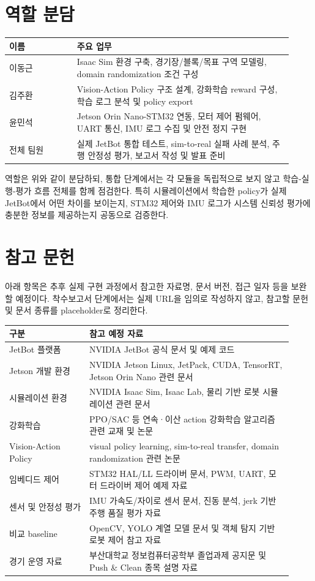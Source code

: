 \documentclass[titlepage]{pnureport}
\begin{document}
\chapter{역할 분담}

\begin{longtable}{p{0.22\linewidth}p{0.70\linewidth}}
\toprule
이름 & 주요 업무 \\
\midrule
\endhead
이동근 & Isaac Sim 환경 구축, 경기장/블록/목표 구역 모델링, domain randomization 조건 구성 \\
김주환 & Vision-Action Policy 구조 설계, 강화학습 reward 구성, 학습 로그 분석 및 policy export \\
윤민석 & Jetson Orin Nano-STM32 연동, 모터 제어 펌웨어, UART 통신, IMU 로그 수집 및 안전 정지 구현 \\
전체 팀원 & 실제 JetBot 통합 테스트, sim-to-real 실패 사례 분석, 주행 안정성 평가, 보고서 작성 및 발표 준비 \\
\bottomrule
\end{longtable}

역할은 위와 같이 분담하되, 통합 단계에서는 각 모듈을 독립적으로 보지 않고 학습-실행-평가 흐름 전체를 함께 점검한다. 특히 시뮬레이션에서 학습한 policy가 실제 JetBot에서 어떤 차이를 보이는지, STM32 제어와 IMU 로그가 시스템 신뢰성 평가에 충분한 정보를 제공하는지 공동으로 검증한다.

\chapter{참고 문헌}

아래 항목은 추후 실제 구현 과정에서 참고한 자료명, 문서 버전, 접근 일자 등을 보완할 예정이다. 착수보고서 단계에서는 실제 URL을 임의로 작성하지 않고, 참고할 문헌 및 문서 종류를 placeholder로 정리한다.

\begin{longtable}{p{0.26\linewidth}p{0.66\linewidth}}
\toprule
구분 & 참고 예정 자료 \\
\midrule
\endhead
JetBot 플랫폼 & NVIDIA JetBot 공식 문서 및 예제 코드 \\
Jetson 개발 환경 & NVIDIA Jetson Linux, JetPack, CUDA, TensorRT, Jetson Orin Nano 관련 문서 \\
시뮬레이션 환경 & NVIDIA Isaac Sim, Isaac Lab, 물리 기반 로봇 시뮬레이션 관련 문서 \\
강화학습 & PPO/SAC 등 연속·이산 action 강화학습 알고리즘 관련 교재 및 논문 \\
Vision-Action Policy & visual policy learning, sim-to-real transfer, domain randomization 관련 논문 \\
임베디드 제어 & STM32 HAL/LL 드라이버 문서, PWM, UART, 모터 드라이버 제어 예제 자료 \\
센서 및 안정성 평가 & IMU 가속도/자이로 센서 문서, 진동 분석, jerk 기반 주행 품질 평가 자료 \\
비교 baseline & OpenCV, YOLO 계열 모델 문서 및 객체 탐지 기반 로봇 제어 참고 자료 \\
경기 운영 자료 & 부산대학교 정보컴퓨터공학부 졸업과제 공지문 및 Push \& Clean 종목 설명 자료 \\
\bottomrule
\end{longtable}
\end{document}
